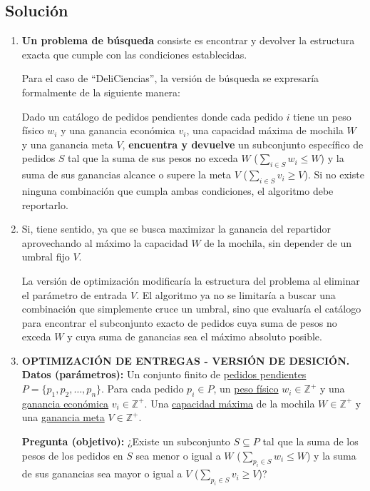 \subsection{Solución}
\begin{enumerate}[label=(\alph*), leftmargin=*]
    \item \textbf{Un problema de búsqueda} consiste es encontrar y devolver la estructura exacta que cumple con las condiciones establecidas.

Para el caso de ``DeliCiencias'', la versión de búsqueda se expresaría formalmente de la siguiente manera:

Dado un catálogo de pedidos pendientes donde cada pedido $i$ tiene un peso físico $w_i$ y una ganancia económica $v_i$, una capacidad máxima de mochila $W$ y una ganancia meta $V$, \textbf{encuentra y devuelve} un subconjunto específico de pedidos $S$ tal que la suma de sus pesos no exceda $W$ ($\sum_{i \in S} w_i \le W$) y la suma de sus ganancias alcance o supere la meta $V$ ($\sum_{i \in S} v_i \ge V$). Si no existe ninguna combinación que cumpla ambas condiciones, el algoritmo debe reportarlo.

    \item Si, tiene sentido, ya que se busca maximizar la ganancia del repartidor aprovechando al máximo la capacidad $W$ de la mochila, sin depender de un umbral fijo $V$.
    
    La versión de optimización modificaría la estructura del problema al eliminar el parámetro de entrada $V$. El algoritmo ya no se limitaría a buscar una combinación que simplemente cruce un umbral, sino que evaluaría el catálogo para encontrar el subconjunto exacto de pedidos cuya suma de pesos no exceda $W$ y cuya suma de ganancias sea el máximo absoluto posible. 
    
    \item \textbf{OPTIMIZACIÓN DE ENTREGAS - VERSIÓN DE DESICIÓN.}\\
    \textbf{Datos (parámetros):} Un conjunto finito de \underline{pedidos pendientes} $P = \{p_1, p_2, \dots, p_n\}$. Para cada pedido $p_i \in P$, un \underline{peso físico} $w_i \in \mathbb{Z}^+$ y una \underline{ganancia económica} $v_i \in \mathbb{Z}^+$. Una \underline{capacidad máxima} de la mochila $W \in \mathbb{Z}^+$ y una \underline{ganancia meta} $V \in \mathbb{Z}^+$.
    
    \textbf{Pregunta (objetivo):} ¿Existe un subconjunto $S \subseteq P$ tal que la suma de los pesos de los pedidos en $S$ sea menor o igual a $W$ ($\sum_{p_i \in S} w_i \le W$) y la suma de sus ganancias sea mayor o igual a $V$ ($\sum_{p_i \in S} v_i \ge V$)?
\end{enumerate}